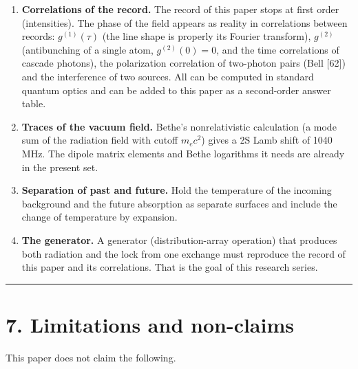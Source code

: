 \documentclass[
  a4paper,
]{article}
\providecommand{\tightlist}{%
  \setlength{\itemsep}{0pt}\setlength{\parskip}{0pt}}
\begin{document}
\begin{enumerate}
\def\labelenumi{\arabic{enumi}.}
\tightlist
\item
  \textbf{Correlations of the record.} The record of this paper stops at
  first order (intensities). The phase of the field appears as reality
  in correlations between records: \(g^{(1)}(\tau)\) (the line shape is
  properly its Fourier transform), \(g^{(2)}\) (antibunching of a single
  atom, \(g^{(2)}(0)=0\), and the time correlations of cascade photons),
  the polarization correlation of two-photon pairs (Bell {[}62{]}) and
  the interference of two sources. All can be computed in standard
  quantum optics and can be added to this paper as a second-order answer
  table.
\item
  \textbf{Traces of the vacuum field.} Bethe's nonrelativistic
  calculation (a mode sum of the radiation field with cutoff \(m_ec^2\))
  gives a 2S Lamb shift of 1040 MHz. The dipole matrix elements and
  Bethe logarithms it needs are already in the present set.
\item
  \textbf{Separation of past and future.} Hold the temperature of the
  incoming background and the future absorption as separate surfaces and
  include the change of temperature by expansion.
\item
  \textbf{The generator.} A generator (distribution-array operation)
  that produces both radiation and the lock from one exchange must
  reproduce the record of this paper and its correlations. That is the
  goal of this research series.
\end{enumerate}

\begin{center}\rule{0.5\linewidth}{0.5pt}\end{center}

\section{7. Limitations and
non-claims}\label{limitations-and-non-claims}

This paper does not claim the following.
\end{document}

